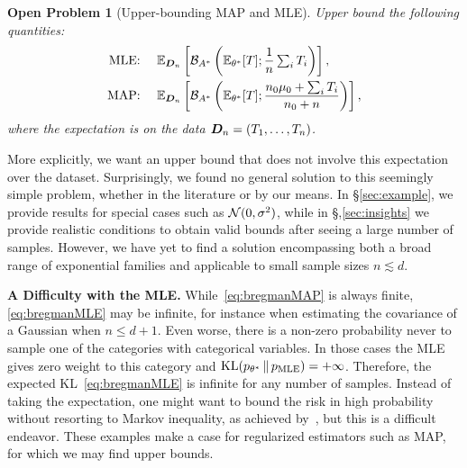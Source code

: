 \documentclass[twoside]{article}
\newtheorem{problem}{Open Problem}
\newcommand*{\expect}[2][]{\ensuremath{\mathbb{E}_{#1} \left[ #2 \right] }} %
\newcommand{\logpart}{A}
\newcommand{\bregmanconj}{\cB_{\logpart^*}}
\newcommand{\nat}{\theta}
\newcommand{\m}{\mu}
\begin{document}
\begin{problem}[Upper-bounding MAP and MLE]
Upper bound the following quantities:
\begin{align}
	\label{eq:bregmanMLE}
	\text{MLE: } \quad &\expect[\mD_n]{\bregmanconj \left (\E_{\nat^*} [T] ;  \inv{n}  \smallsum_i T_i \right )}, \\
	\label{eq:bregmanMAP}
	\text{MAP: } \quad &\expect[\mD_n]{\bregmanconj \left (\E_{\nat^*} [T] ; \frac{n_0 \m_0 + \smallsum_i T_i}{n_0+n} \right )},
\end{align}
where the expectation is on the data ${\bm{D}}_n = (T_1, \dots, T_n)$.
\end{problem}

More explicitly, we want an upper bound that does not involve this expectation over the dataset.
Surprisingly, we found no general solution to this seemingly simple problem, whether in the literature or by our means.
In \S\ref{sec:example}, we provide results for special cases such as ${\mathcal N}(0, \sigma^2)$,
while in \S,\ref{sec:insights} we provide realistic conditions to obtain valid bounds after seeing a large number of samples.
However, we have yet to find a solution encompassing both a broad range of exponential families
and applicable to small sample sizes $n \lesssim d$.

{\bf A Difficulty with the MLE.}
While~\eqref{eq:bregmanMAP} is always finite, \eqref{eq:bregmanMLE} may be infinite,
for instance when estimating the covariance of a Gaussian when $n \leq d + 1$.
Even worse, there is a non-zero probability never to sample one of the categories with categorical variables.
In those cases the MLE gives zero weight to this category and $\KL(p_{\nat^*} \,\Vert\, p_\text{MLE} ) = +\infty$.
Therefore, the expected KL~\eqref{eq:bregmanMLE} is infinite for any number of samples.
Instead of taking the expectation, one might want to bound the risk in high probability
without resorting to Markov inequality, as achieved by~\citep{ostrovskii2021finite},
 but this is a difficult endeavor.
These examples make a case for regularized estimators such as MAP,
for which we may find upper bounds.
\end{document}
